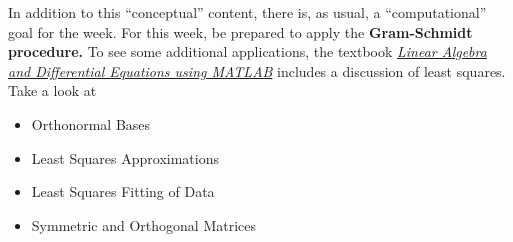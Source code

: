 \documentclass{homework}
\begin{document}
In addition to this ``conceptual'' content, there is, as usual, a ``computational'' goal for the week.  For this week, be prepared to apply the \textbf{Gram-Schmidt procedure.}  To see some additional applications, the textbook
\textit{\href{/courses/43735/files/folder/textbooks}{Linear Algebra
    and Differential Equations using MATLAB}} includes a discussion of
least squares.  Take a look at
\begin{itemize}
\item {} Orthonormal Bases
\item {} Least Squares Approximations
\item {} Least Squares Fitting of Data
\item {} Symmetric and Orthogonal Matrices
\end{itemize}
\end{document}

